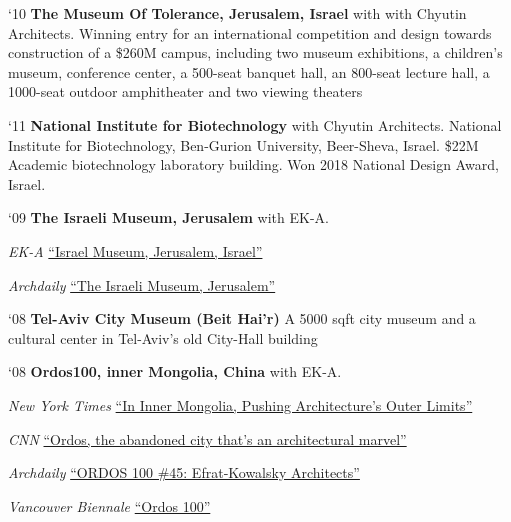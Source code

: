 \begin{tablist}

   \item[`10] \tab \textbf{The Museum Of Tolerance, Jerusalem, Israel} with with Chyutin Architects. Winning entry for an international competition and design towards construction of a \$260M campus, including two museum exhibitions, a children's museum, conference center, a 500-seat banquet hall, an 800-seat lecture hall, a 1000-seat outdoor amphitheater and two viewing theaters

   \item[`11] \tab \textbf{National Institute for Biotechnology} with Chyutin Architects. National Institute for Biotechnology, Ben-Gurion University, Beer-Sheva, Israel. \$22M Academic biotechnology laboratory building. Won 2018 National Design Award, Israel.

   \item[`09] \tab \textbf{The Israeli Museum, Jerusalem} with EK-A.

   \begin{tablist}
      \item[\textit{EK-A}] \href{http://www.efrat-kowalsky.co.il/project/test/}{\enquote{Israel Museum, Jerusalem, Israel}}

      \item[\textit{Archdaily}] \href {https://www.archdaily.com/373684/israel-museum-james-carpenter-design-associates}{\enquote{The Israeli Museum, Jerusalem}}
   \end{tablist}

   \item[`08] \tab \textbf{Tel-Aviv City Museum (Beit Hai'r)} A 5000 sqft city museum and a cultural center in Tel-Aviv’s old City-Hall building

   \item[`08] \tab \textbf{Ordos100, inner Mongolia, China} with EK-A.

   \begin{tablist}
      \item[\textit{New York Times}] \href{https://www.nytimes.com/2008/05/01/garden/01mongolia.html}{\enquote{In Inner Mongolia, Pushing Architecture's Outer Limits}}

      \item[\textit{CNN}] \href{https://www.cnn.com/style/article/china-ordos-ghost-town/index.html}{\enquote{Ordos, the abandoned city that's an architectural marvel}}

      \item[\textit{Archdaily}] \href{https://www.archdaily.com/32535/ordos-100-45-efrat-kowalsky-architects}{\enquote{ORDOS 100 \#45: Efrat‐Kowalsky Architects}}

      \item[\textit{Vancouver Biennale}]
      \href{https://vimeo.com/136530514}{\enquote{Ordos 100}}
   \end{tablist}

\end{tablist}